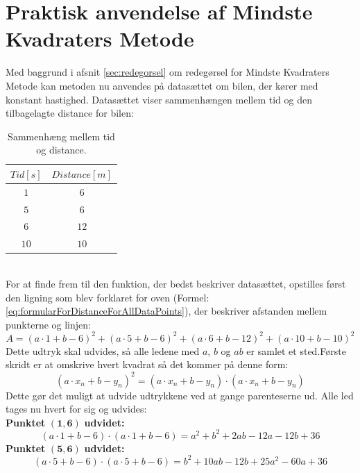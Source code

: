 \section{Praktisk anvendelse af Mindste Kvadraters Metode}\label{sec:udregning}
Med baggrund i afsnit \ref{sec:redegorsel} om redegørsel for Mindste Kvadraters Metode kan metoden nu anvendes på datasættet om bilen, der kører med konstant hastighed. Datasættet viser sammenhængen mellem tid og den tilbagelagte distance for bilen:
\begin{table}[h!]
    \centering
    \begin{tabular}{|c|c|} \hline
        $Tid [s]$ & $Distance [m]$ \\ \hline
        $1$ & $6$ \\ 
        $5$ & $6$ \\
        $6$ & $12$ \\
        $10$ & $10$ \\ \hline
    \end{tabular}
    \caption{Sammenhæng mellem tid og distance.}
\end{table}\\
For at finde frem til den funktion, der bedst beskriver datasættet, opstilles først den ligning som blev forklaret for oven (Formel: \ref{eq:formularForDistanceForAllDataPoints}), der beskriver afstanden mellem punkterne og linjen:
\begin{equation*}
    A = (a \cdot 1 + b - 6)^2 + (a \cdot 5 + b - 6)^2 + (a \cdot 6 + b - 12)^2 + (a \cdot 10 + b - 10)^2
\end{equation*}
Dette udtryk skal udvides, så alle ledene med $a$, $b$ og $ab$ er samlet et sted.Første skridt er at omskrive hvert kvadrat så det kommer på denne form: 
\begin{equation*}
    (a \cdot x_n + b - y_n)^2 = (a \cdot x_n + b - y_n) \cdot (a \cdot x_n + b - y_n)
\end{equation*}
Dette gør det muligt at udvide udtrykkene ved at gange parenteserne ud. Alle led tages nu hvert for sig og udvides:\\
\textbf{Punktet} $\mathbf{(1,6)}$ \textbf{udvidet:}
\begin{equation*}
    (a \cdot 1 + b - 6) \cdot (a \cdot 1 + b - 6) = a^2 + b^2 + 2ab - 12a - 12b + 36
\end{equation*}
\textbf{Punktet} $\mathbf{(5,6)}$ \textbf{udvidet:}
\begin{equation*}
    (a \cdot 5 + b - 6) \cdot (a \cdot 5 + b - 6) = b^2 + 10ab -12b + 25a^2 - 60a + 36
\end{equation*}
